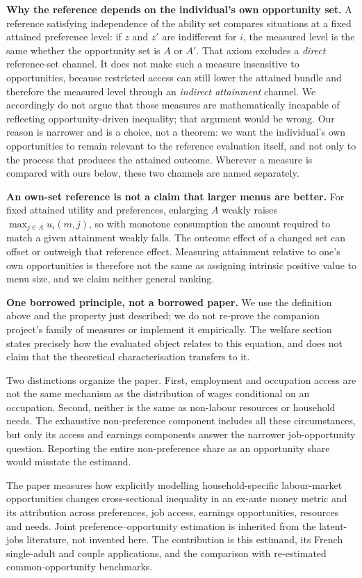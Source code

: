 \documentclass[11pt,a4paper]{article}
\begin{document}
\textbf{Why the reference depends on the individual's own opportunity set.} A reference satisfying independence of the ability set compares situations at a fixed attained preference level: if \(z\) and \(z'\) are indifferent for \(i\), the measured level is the same whether the opportunity set is \(A\) or \(A'\). That axiom excludes a \emph{direct} reference-set channel. It does not make such a measure insensitive to opportunities, because restricted access can still lower the attained bundle and therefore the measured level through an \emph{indirect attainment} channel. We accordingly do not argue that those measures are mathematically incapable of reflecting opportunity-driven inequality; that argument would be wrong. Our reason is narrower and is a choice, not a theorem: we want the individual's own opportunities to remain relevant to the reference evaluation itself, and not only to the process that produces the attained outcome. Wherever a measure is compared with ours below, these two channels are named separately.

\textbf{An own-set reference is not a claim that larger menus are better.} For fixed attained utility and preferences, enlarging \(A\) weakly raises \(\max_{j\in A}u_i(m,j)\), so with monotone consumption the amount required to match a given attainment weakly falls. The outcome effect of a changed set can offset or outweigh that reference effect. Measuring attainment relative to one's own opportunities is therefore not the same as assigning intrinsic positive value to menu size, and we claim neither general ranking.

\textbf{One borrowed principle, not a borrowed paper.} We use the definition above and the property just described; we do not re-prove the companion project's family of measures or implement it empirically. The welfare section states precisely how the evaluated object relates to this equation, and does not claim that the theoretical characterisation transfers to it.

Two distinctions organize the paper. First, employment and occupation access are not the same mechanism as the distribution of wages conditional on an occupation. Second, neither is the same as non-labour resources or household needs. The exhaustive non-preference component includes all these circumstances, but only its access and earnings components answer the narrower job-opportunity question. Reporting the entire non-preference share as an opportunity share would misstate the estimand.

The paper measures how explicitly modelling household-specific labour-market opportunities changes cross-sectional inequality in an ex-ante money metric and its attribution across preferences, job access, earnings opportunities, resources and needs. Joint preference--opportunity estimation is inherited from the latent-jobs literature, not invented here. The contribution is this estimand, its French single-adult and couple applications, and the comparison with re-estimated common-opportunity benchmarks.
\end{document}
